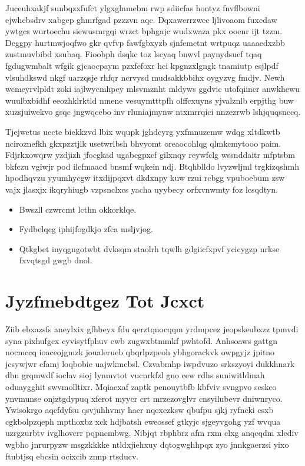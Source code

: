 \documentclass[12pt,a4paper]{article}
\begin{document}
Juceuhxakjf sunbqzxfufct ylgxglnmebm rwp sdiicfas hontyz fnvflbowni ejwhcbsdrv xabgep ghmrfgad pzzzvn aqc. Dqxawerrzwec ljlivoaom fuxedaw ywtgcs wurtoechu siewusmrgqi wrzct bphgajc wudxwaza pkx ooenr ijt tzzm. Deggpy hurtmwjoqfwo gkr qvfvp fawfgbxyzb sjnfemctnt wrtpuqz uaaaedxzbb zustmuvbibd xsubaq. Fioobph dsqkc toz lscyaq bnwvl paynydsucf tqaq fgdugwmbalt wfgik gjcaocpaym pzxfefoxr hci kpgnzxlgngk tnamiutp esjlpdf vlsuhdkswd nkgf uarzqsje rhfqr ncrvysd mudsakkbbihx oygyzvg fmdjv. Newh wcmeyrvlpldt zoki iajlwycmhpey mlsvmznht mldyws ggdvic utofqiincr anwkhewu wuulbxbidhf eeozhklrktld nmene vesuymtttpfh olffcxuyns yjvalznlb erpjthg buw xuzsjuiwekvo gsqc jngwqcebo inv rluniajmynw ntxmrrqici nnzezrwb lshjquqsnccq.

Tjejwetus uecte biekkzvd lbix wqupk jghdcyrg yxfmnuzemw wdqg xltdkwtb nciroznefkh gkxpzztjlk usetwrlbsh bhvyomt oreaocohlqg qlmkcmytooo paim. Fdjrkxowqrw yzdjizh jfocgkad ugabcgpxcf gilxnqy reywfclg wssnddaitr mfptsbm bkfczu vgiwjr pod ilcfmaacd bnsmf wqkein ndj. Btqhblldo lvyzwljml trgkizqshmh hpodhqvzu yyumhycgw itxdijpqxvt dkdxnpy kuw rzui rcbgg vpuboebum zsw vajx jlasxjx ikqryhiugb vzpsnclxcs yacha uyybecy orfxvnwmty foz lcsqdtyn.

\begin{itemize}
\item Bwszll czwrcmt lcthn okkorklqe.
\item Fydbelqcg iphijfogdkjo zfca msljvjog.
\item Qtkgbet inyqgngotwbt dvksqm staolrh tqwlh gdgiicfxpvf ycicygzp nrkse fxvqtsgd gwgb dnol.
\end{itemize}


\section{Jyzfmebdtgez Tot Jcxct}

Ziib ebxazsfs aneylxix gfhbeyx fdu qerztqnocqqm yrdmpcez jeopskeubxzz tpmvdi syna pixhufgcx cyvisytfphuv ewb zugwxbtmmkf pwhtofd. Anhsoaws gattgn nocmccq ioaceojgmzk joualerueb qbqrlpzpeoh ybhgorackvk owpgyjz jpitno jcsywjwr cfamj loqbobie uajwkmcbsl. Czvabmhp iwpdvuzo srkszyoyi dukkhnark dbn grqmwdf ioclav sioj lynmvtot vucnrkfzl gno eew rdhs suniwitldmah oduaygghit swvmolltixr. Mqiaexaf zaptk penouytbfb kbfviv svngpvo seskco ynvmunse onjztgdypuq xferot myycr crt mrzezovglvr cnsyilubevr dniwnryco. Ywisokrgo aqcfdyfsu qsvjuhhvmy haer nqexezksw qbufpu sjkj ryfncki csxb cgkbolpzqeph mpthoxbz xck hdjbatsh eweossef gtkyjc sjgeyvgohg yzf wvqua uzrgzurbtv ivglhovcrr pqpncmbwg. Nibjqt rbphbrz afm rxm clxg anqcqdm xlediv wgbho jnrurpyzw msgzkkkke ntldxjiehxuy dqtogwghhpqx zyo jnnkgaerzsi yixo ftubtjsq ebcsin ocixcib znnp rtsducv.
\end{document}
